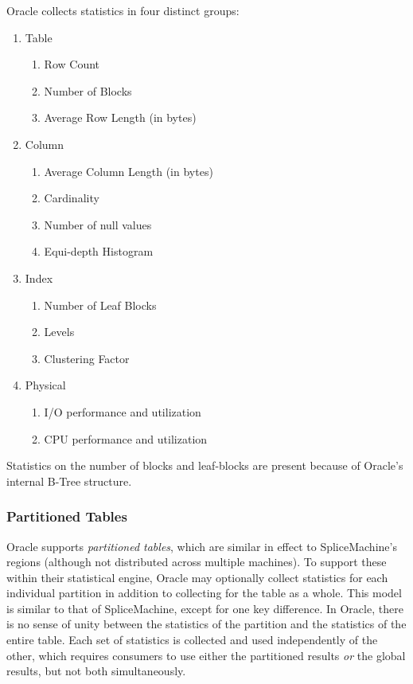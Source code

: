 Oracle collects statistics in four distinct groups\cite{Oracle}:
\begin{enumerate}
				\item Table
								\begin{enumerate}
												\item	Row Count
												\item Number of Blocks
												\item Average Row Length (in bytes)
								\end{enumerate}
				\item Column
								\begin{enumerate}
												\item Average Column Length (in bytes)
												\item Cardinality
												\item Number of null values
												\item Equi-depth Histogram
								\end{enumerate}
				\item Index
								\begin{enumerate}
												\item Number of Leaf Blocks
												\item Levels
												\item Clustering Factor
								\end{enumerate}
				\item Physical
								\begin{enumerate}
												\item I/O performance and utilization
												\item CPU performance and utilization
								\end{enumerate}
\end{enumerate}
Statistics on the number of blocks and leaf-blocks are present because of Oracle's internal B-Tree structure.

\subsubsection{Partitioned Tables}
Oracle supports \emph{partitioned tables}, which are similar in effect to SpliceMachine's regions (although not distributed across multiple machines). To support these within their statistical engine, Oracle may optionally collect statistics for each individual partition in addition to collecting for the table as a whole\cite{Oracle}. This model is similar to that of SpliceMachine, except for one key difference. In Oracle, there is no sense of unity between the statistics of the partition and the statistics of the entire table. Each set of statistics is collected and used independently of the other, which requires consumers to use either the partitioned results \emph{or} the global results, but not both simultaneously.


